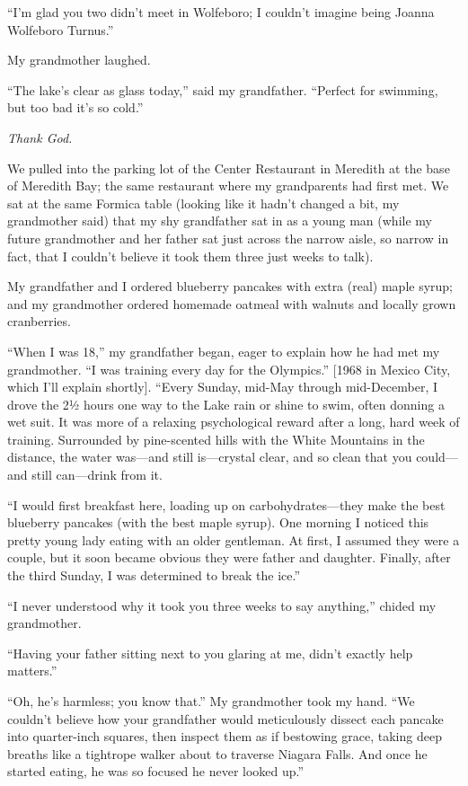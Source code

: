 ``I'm glad you two didn't meet in Wolfeboro; I couldn't imagine being
Joanna Wolfeboro Turnus.''

My grandmother laughed.

``The lake's clear as glass today,'' said my grandfather. ``Perfect for
swimming, but too bad it's so cold.''

\emph{Thank God.}

We pulled into the parking lot of the Center Restaurant in Meredith at
the base of Meredith Bay; the same restaurant where my grandparents had
first met. We sat at the same Formica table (looking like it hadn't
changed a bit, my grandmother said) that my shy grandfather sat in as a
young man (while my future grandmother and her father sat just across
the narrow aisle, so narrow in fact, that I couldn't believe it took
them three just weeks to talk).

My grandfather and I ordered blueberry pancakes with extra (real) maple
syrup; and my grandmother ordered homemade oatmeal with walnuts and
locally grown cranberries.

``When I was 18,'' my grandfather began, eager to explain how he had met
my grandmother. ``I was training every day for the Olympics.'' {[}1968
in Mexico City, which I'll explain shortly{]}. ``Every Sunday, mid-May
through mid-December, I drove the 2½ hours one way to the Lake rain or
shine to swim, often donning a wet suit. It was more of a relaxing
psychological reward after a long, hard week of training. Surrounded by
pine-scented hills with the White Mountains in the distance, the water
was---and still is---crystal clear, and so clean that you could---and
still can---drink from it.

``I would first breakfast here, loading up on carbohydrates---they make
the best blueberry pancakes (with the best maple syrup). One morning I
noticed this pretty young lady eating with an older gentleman. At first,
I assumed they were a couple, but it soon became obvious they were
father and daughter. Finally, after the third Sunday, I was determined
to break the ice.''

``I never understood why it took you three weeks to say anything,''
chided my grandmother.

``Having your father sitting next to you glaring at me, didn't exactly
help matters.''

``Oh, he's harmless; you know that.'' My grandmother took my hand. ``We
couldn't believe how your grandfather would meticulously dissect each
pancake into quarter-inch squares, then inspect them as if bestowing
grace, taking deep breaths like a tightrope walker about to traverse
Niagara Falls. And once he started eating, he was so focused he never
looked up.''

